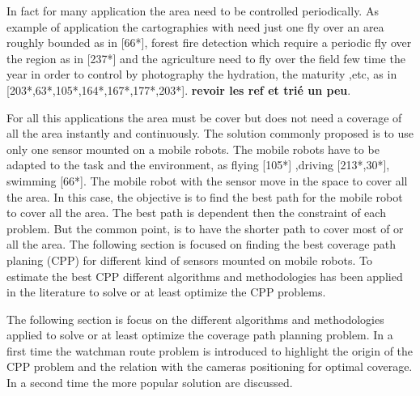 In fact for many application the area need to be controlled periodically. As example  of application the cartographies  with need  just one fly over an area roughly bounded as in [66*], forest fire detection which require a periodic fly over the region as in [237*] and the agriculture need to fly over the field few time the year in order to control by photography the hydration, the maturity ,etc, as in [203*,63*,105*,164*,167*,177*,203*]. \textbf{revoir les ref et trié un peu}.

For all this applications the area must be cover but does not need a coverage of all the area instantly and continuously. The solution commonly proposed is to use only one sensor mounted on a mobile robots. The mobile robots have to be adapted to the task and the environment, as flying [105*] ,driving [213*,30*], swimming [66*]. The mobile robot with the sensor move in the space to cover all the area. In this case, the objective is to find the best path for the mobile robot to cover all the area. The best path is dependent then the constraint of each problem. But the common point, is to have the shorter path to cover most of or all the area.
The following section is focused on finding the best coverage path planing (CPP) for different kind of sensors mounted on mobile robots. To estimate the best CPP different algorithms and methodologies has been applied in the literature  to solve or at least optimize the CPP problems.

  The following section is focus on the different algorithms and methodologies applied to solve or at least optimize the coverage path planning problem. In a first time the watchman route problem is introduced to highlight the origin of the CPP problem and the relation with the cameras positioning for optimal coverage. In a second time the more popular solution are discussed.
 





%
%





